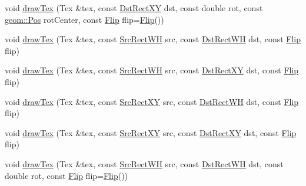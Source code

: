 \begin{DoxyCompactItemize}
\item 
void \mbox{\hyperlink{classrolmodl_1_1blend_mode_1_1_ren_ab9463503cd984058ccfd07f23828cdcd}{draw\+Tex}} (Tex \&tex, const \mbox{\hyperlink{structrolmodl_1_1blend_mode_1_1_dst_rect_x_y}{Dst\+Rect\+XY}} dst, const double rot, const \mbox{\hyperlink{structrolmodl_1_1geom_1_1_pos}{geom\+::\+Pos}} rot\+Center, const \mbox{\hyperlink{structrolmodl_1_1blend_mode_1_1_flip}{Flip}} flip=\mbox{\hyperlink{structrolmodl_1_1blend_mode_1_1_flip}{Flip}}())
\item 
void \mbox{\hyperlink{classrolmodl_1_1blend_mode_1_1_ren_abc804f35e49bed450df9f3e7f4f1eb45}{draw\+Tex}} (Tex \&tex, const \mbox{\hyperlink{structrolmodl_1_1blend_mode_1_1_src_rect_w_h}{Src\+Rect\+WH}} src, const \mbox{\hyperlink{structrolmodl_1_1blend_mode_1_1_dst_rect_w_h}{Dst\+Rect\+WH}} dst, const \mbox{\hyperlink{structrolmodl_1_1blend_mode_1_1_flip}{Flip}} flip)
\item 
void \mbox{\hyperlink{classrolmodl_1_1blend_mode_1_1_ren_af317aa75b80eea557415861027509591}{draw\+Tex}} (Tex \&tex, const \mbox{\hyperlink{structrolmodl_1_1blend_mode_1_1_src_rect_w_h}{Src\+Rect\+WH}} src, const \mbox{\hyperlink{structrolmodl_1_1blend_mode_1_1_dst_rect_x_y}{Dst\+Rect\+XY}} dst, const \mbox{\hyperlink{structrolmodl_1_1blend_mode_1_1_flip}{Flip}} flip)
\item 
void \mbox{\hyperlink{classrolmodl_1_1blend_mode_1_1_ren_ac2725c17a9391876f9c27a38c35d9b04}{draw\+Tex}} (Tex \&tex, const \mbox{\hyperlink{structrolmodl_1_1blend_mode_1_1_src_rect_x_y}{Src\+Rect\+XY}} src, const \mbox{\hyperlink{structrolmodl_1_1blend_mode_1_1_dst_rect_w_h}{Dst\+Rect\+WH}} dst, const \mbox{\hyperlink{structrolmodl_1_1blend_mode_1_1_flip}{Flip}} flip)
\item 
void \mbox{\hyperlink{classrolmodl_1_1blend_mode_1_1_ren_a0bf73bb2ff17b6d6f7935de5e2d35b27}{draw\+Tex}} (Tex \&tex, const \mbox{\hyperlink{structrolmodl_1_1blend_mode_1_1_src_rect_x_y}{Src\+Rect\+XY}} src, const \mbox{\hyperlink{structrolmodl_1_1blend_mode_1_1_dst_rect_x_y}{Dst\+Rect\+XY}} dst, const \mbox{\hyperlink{structrolmodl_1_1blend_mode_1_1_flip}{Flip}} flip)
\item 
void \mbox{\hyperlink{classrolmodl_1_1blend_mode_1_1_ren_a1dd7a4004d92135390126220eef4e202}{draw\+Tex}} (Tex \&tex, const \mbox{\hyperlink{structrolmodl_1_1blend_mode_1_1_src_rect_w_h}{Src\+Rect\+WH}} src, const \mbox{\hyperlink{structrolmodl_1_1blend_mode_1_1_dst_rect_w_h}{Dst\+Rect\+WH}} dst, const double rot, const \mbox{\hyperlink{structrolmodl_1_1blend_mode_1_1_flip}{Flip}} flip=\mbox{\hyperlink{structrolmodl_1_1blend_mode_1_1_flip}{Flip}}())

\end{DoxyCompactItemize}
